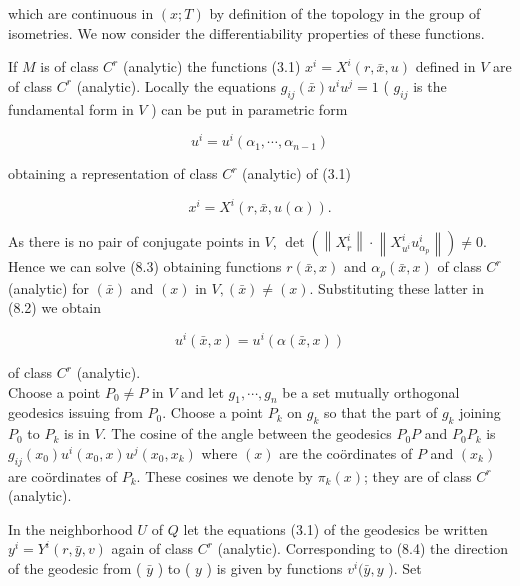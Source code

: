 \documentclass[10pt]{article}
\begin{document}
which are continuous in $(x ; T)$ by definition of the topology in the group of isometries. We now consider the differentiability properties of these functions.

If $M$ is of class $C^{r}$ (analytic) the functions (3.1) $x^{i}=X^{i}(r, \bar{x}, u)$ defined in $V$ are of class $C^{r}$ (analytic). Locally the equations $g_{i j}(\bar{x}) u^{i} u^{j}=1$ ( $g_{i j}$ is the fundamental form in $V$ ) can be put in parametric form


\begin{equation*}
u^{i}=u^{i}\left(\alpha_{1}, \cdots, \alpha_{n-1}\right) \tag{8.2}
\end{equation*}


obtaining a representation of class $C^{r}$ (analytic) of (3.1)


\begin{equation*}
x^{i}=X^{i}(r, \bar{x}, u(\alpha)) . \tag{8.3}
\end{equation*}


As there is no pair of conjugate points in $V$, $\operatorname{det}\left(\left\|X_{r}^{i}\right\| \cdot\left\|X_{u^{i}}^{i} u_{\alpha_{p}}^{i}\right\|\right) \neq 0$. Hence we can solve (8.3) obtaining functions $r(\bar{x}, x)$ and $\alpha_{\rho}(\bar{x}, x)$ of class $C^{r}$ (analytic) for $(\bar{x})$ and $(x)$ in $V,(\bar{x}) \neq(x)$. Substituting these latter in (8.2) we obtain


\begin{equation*}
u^{i}(\bar{x}, x)=u^{i}(\alpha(\bar{x}, x)) \tag{8.4}
\end{equation*}


of class $C^{r}$ (analytic).\\
Choose a point $P_{0} \neq P$ in $V$ and let $g_{1}, \cdots, g_{n}$ be a set mutually orthogonal geodesics issuing from $P_{0}$. Choose a point $P_{k}$ on $g_{k}$ so that the part of $g_{k}$ joining $P_{0}$ to $P_{k}$ is in $V$. The cosine of the angle between the geodesics $P_{0} P$ and $P_{0} P_{k}$ is $g_{i j}\left(x_{0}\right) u^{i}\left(x_{0}, x\right) u^{j}\left(x_{0}, x_{k}\right)$ where $(x)$ are the coördinates of $P$ and $\left(x_{k}\right)$ are coördinates of $P_{k}$. These cosines we denote by $\pi_{k}(x)$; they are of class $C^{r}$ (analytic).

In the neighborhood $U$ of $Q$ let the equations (3.1) of the geodesics be written $y^{i}=Y^{i}(r, \bar{y}, v)$ again of class $C^{r}$ (analytic). Corresponding to (8.4) the direction of the geodesic from ( $\bar{y}$ ) to ( $y$ ) is given by functions $v^{i}(\bar{y}, y$ ). Set
\end{document}
